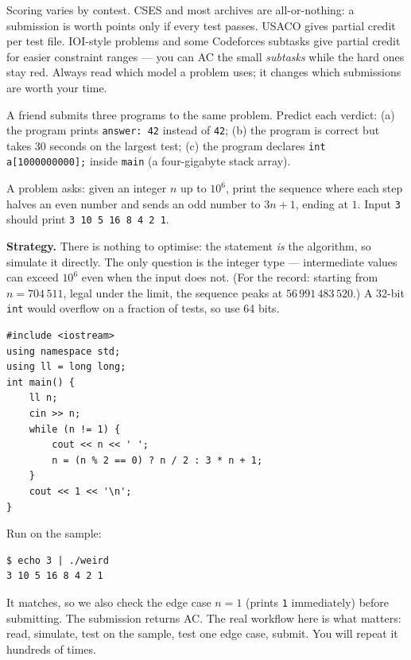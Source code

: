 Scoring varies by contest. CSES and most archives are all-or-nothing: a
submission is worth points only if every test passes. USACO gives partial
credit per test file. IOI-style problems and some Codeforces subtasks give
partial credit for easier constraint ranges --- you can AC the small
\emph{subtasks} while the hard ones stay red. Always read which
model a problem uses; it changes which submissions are worth your time.

\begin{exercise}[easy]\label{exr:verdicts}
A friend submits three programs to the same problem. Predict each verdict:
(a) the program prints \texttt{answer: 42} instead of \texttt{42};
(b) the program is correct but takes 30 seconds on the largest test;
(c) the program declares \texttt{int a[1000000000];} inside \texttt{main}
(a four-gigabyte stack array).
\end{exercise}

\begin{example}
\label{ex:weird}
A problem asks: given an integer $n$ up to $10^6$, print the sequence where
each step halves an even number and sends an odd number to $3n+1$, ending at
$1$. Input \texttt{3} should print \texttt{3 10 5 16 8 4 2 1}.
\par\smallskip
\textbf{Strategy.} There is nothing to optimise: the statement \emph{is} the
algorithm, so simulate it directly. The only question is the integer type ---
intermediate values can exceed $10^6$ even when the input does not. (For the
record: starting from $n=704\,511$, legal under the limit, the sequence peaks
at $56\,991\,483\,520$.) A 32-bit \texttt{int} would overflow on a fraction of
tests, so use 64 bits.
\par\smallskip
\begin{solution}
\begin{lstlisting}
#include <iostream>
using namespace std;
using ll = long long;
int main() {
    ll n;
    cin >> n;
    while (n != 1) {
        cout << n << ' ';
        n = (n % 2 == 0) ? n / 2 : 3 * n + 1;
    }
    cout << 1 << '\n';
}
\end{lstlisting}
Run on the sample:
\begin{lstlisting}[numbers=none]
$ echo 3 | ./weird
3 10 5 16 8 4 2 1
\end{lstlisting}
It matches, so we also check the edge case $n=1$ (prints \texttt{1}
immediately) before submitting. The submission returns AC. The real workflow
here is what matters: read, simulate, test on the sample, test one edge case,
submit. You will repeat it hundreds of times.
\end{solution}
\end{example}

